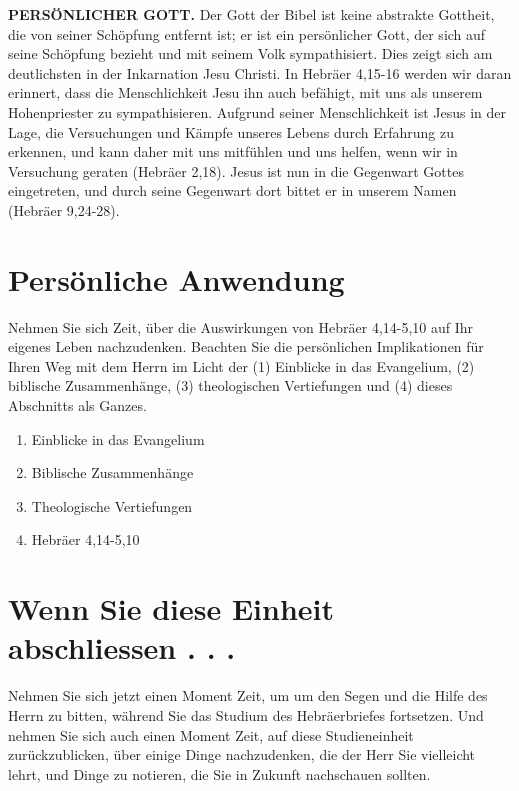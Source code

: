 \documentclass[]{krantz}
\providecommand{\tightlist}{%
  \setlength{\itemsep}{0pt}\setlength{\parskip}{0pt}}
\begin{document}
\textbf{PERSÖNLICHER GOTT.} Der Gott der Bibel ist keine abstrakte
Gottheit, die von seiner Schöpfung entfernt ist; er ist ein persönlicher
Gott, der sich auf seine Schöpfung bezieht und mit seinem Volk
sympathisiert. Dies zeigt sich am deutlichsten in der Inkarnation Jesu
Christi. In Hebräer 4,15-16 werden wir daran erinnert, dass die
Menschlichkeit Jesu ihn auch befähigt, mit uns als unserem Hohenpriester
zu sympathisieren. Aufgrund seiner Menschlichkeit ist Jesus in der Lage,
die Versuchungen und Kämpfe unseres Lebens durch Erfahrung zu erkennen,
und kann daher mit uns mitfühlen und uns helfen, wenn wir in Versuchung
geraten (Hebräer 2,18). Jesus ist nun in die Gegenwart Gottes
eingetreten, und durch seine Gegenwart dort bittet er in unserem Namen
(Hebräer 9,24-28).

\section{Persönliche Anwendung}\label{persuxf6nliche-anwendung-3}

Nehmen Sie sich Zeit, über die Auswirkungen von Hebräer 4,14-5,10 auf
Ihr eigenes Leben nachzudenken. Beachten Sie die persönlichen
Implikationen für Ihren Weg mit dem Herrn im Licht der (1) Einblicke in
das Evangelium, (2) biblische Zusammenhänge, (3) theologischen
Vertiefungen und (4) dieses Abschnitts als Ganzes.

\begin{enumerate}
\def\labelenumi{\arabic{enumi}.}
\tightlist
\item
  Einblicke in das Evangelium
\item
  Biblische Zusammenhänge
\item
  Theologische Vertiefungen
\item
  Hebräer 4,14-5,10
\end{enumerate}

\section{Wenn Sie diese Einheit abschliessen . .
.}\label{wenn-sie-diese-einheit-abschliessen-.-.-.-3}

Nehmen Sie sich jetzt einen Moment Zeit, um um den Segen und die Hilfe
des Herrn zu bitten, während Sie das Studium des Hebräerbriefes
fortsetzen. Und nehmen Sie sich auch einen Moment Zeit, auf diese
Studieneinheit zurückzublicken, über einige Dinge nachzudenken, die der
Herr Sie vielleicht lehrt, und Dinge zu notieren, die Sie in Zukunft
nachschauen sollten.
\end{document}
